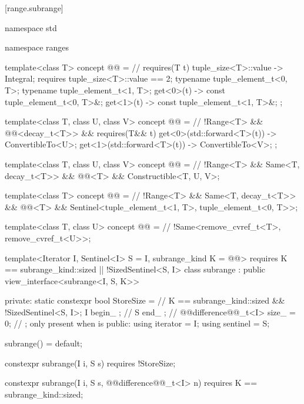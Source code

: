 [range.subrange]{}

%
\begin{codeblock}
namespace std { namespace ranges {
    template<class T>
    concept @@ = // \expos
      requires(T t) {
        { tuple_size<T>::value } -> Integral;
        requires tuple_size<T>::value == 2;
        typename tuple_element_t<0, T>;
        typename tuple_element_t<1, T>;
        { get<0>(t) } -> const tuple_element_t<0, T>&;
        { get<1>(t) } -> const tuple_element_t<1, T>&;
      };

    template<class T, class U, class V>
    concept @@ = // \expos
      !Range<T> && @@<decay_t<T>> &&
      requires(T&& t) {
        { get<0>(std::forward<T>(t)) } -> ConvertibleTo<U>;
        { get<1>(std::forward<T>(t)) } -> ConvertibleTo<V>;
      };

    template<class T, class U, class V>
    concept @@ = // \expos
      !Range<T> && Same<T, decay_t<T>> && @@<T> &&
      Constructible<T, U, V>;

    template<class T>
    concept @@ = // \expos
      !Range<T> && Same<T, decay_t<T>> && @@<T> &&
      Sentinel<tuple_element_t<1, T>, tuple_element_t<0, T>>;

    template<class T, class U>
    concept @@ = // \expos
      !Same<remove_cvref_t<T>, remove_cvref_t<U>>;

    template<Iterator I, Sentinel<I> S = I, subrange_kind K =
        @\oldtxt{\seebelow}@>
      requires K == subrange_kind::sized || !SizedSentinel<S, I>
    class subrange : public view_interface<subrange<I, S, K>> {
    private:
      static constexpr bool StoreSize =  // \expos
        K == subrange_kind::sized && !SizedSentinel<S, I>;
      I begin_ {}; // \expos
      S end_ {};   // \expos
      @@difference@@_t<I> size_ = 0; // \expos; only present when  is 
    public:
      using iterator = I;
      using sentinel = S;

      subrange() = default;

      constexpr subrange(I i, S s) requires !StoreSize;

      constexpr subrange(I i, S s, @@difference@@_t<I> n)
        requires K == subrange_kind::sized;

}}}
\end{codeblock}
